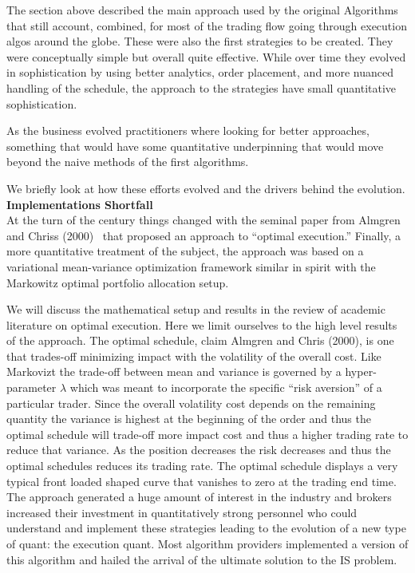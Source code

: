 The section above described the main approach used by the original Algorithms that still account, combined, for most of the trading flow going through execution algos around the globe. These were also the  first strategies to be created. They were conceptually simple but overall quite effective. While over time they evolved in sophistication by using better analytics, order placement, and more nuanced handling of the schedule, the approach to the strategies have small quantitative sophistication.


As the business evolved practitioners where looking for better approaches, something that would have some quantitative underpinning that would move beyond the naive methods of the first algorithms.


We briefly look at how these efforts evolved and the drivers behind the evolution. \\


\noindent\textbf{Implementations Shortfall} \\


At the turn of the century things changed with the seminal paper from Almgren and Chriss (2000)~\cite{alm2000} that proposed an approach to ``optimal execution.'' Finally, a more quantitative treatment of the subject, the approach was based on a variational  mean-variance optimization framework similar in spirit with the Markowitz optimal portfolio allocation setup.



We will discuss the  mathematical setup and results in the review of  academic literature on optimal execution. Here we limit ourselves to the high level results of the approach. The optimal schedule, claim Almgren and Chris (2000), is one that trades-off minimizing impact with the volatility of the overall cost. Like Markovizt the trade-off between mean and variance is governed by a hyper-parameter $\lambda$ which was meant to incorporate the specific ``risk aversion'' of a particular trader. Since the overall volatility cost depends on the remaining quantity the variance is highest at the beginning of the order and thus the optimal schedule will trade-off more impact cost and thus a higher trading rate to reduce that variance. As the position decreases the risk decreases and thus the optimal schedules reduces its trading rate. The optimal schedule displays a very typical front loaded shaped curve that vanishes to zero at the trading end time.\\

The approach generated a huge amount of interest in the industry and  brokers increased their investment in quantitatively strong personnel who could understand and implement these strategies leading to the evolution of a new type of quant: the execution quant. Most algorithm providers implemented a version of this algorithm and hailed the arrival of the ultimate solution to the IS problem. 

